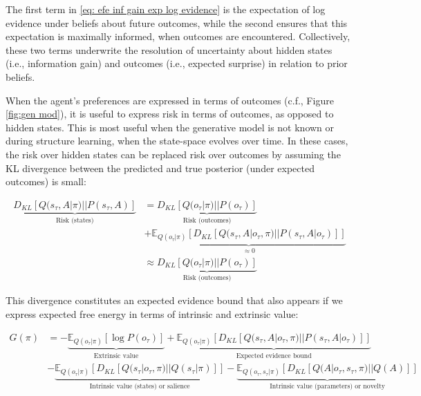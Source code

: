 \documentclass[review,12pt,authoryear]{elsarticle}
\begin{document}
The first term in \eqref{eq: efe inf gain exp log evidence} is the expectation of log evidence under beliefs about future outcomes, while the second ensures that this expectation is maximally informed, when outcomes are encountered. Collectively, these two terms underwrite the resolution of uncertainty about hidden states (i.e., information gain) and outcomes (i.e., expected surprise) in relation to prior beliefs.

When the agent's preferences are expressed in terms of outcomes (c.f., Figure \ref{fig:gen mod}), it is useful to express risk in terms of outcomes, as opposed to hidden states. This is most useful when the generative model is not known or during structure learning, when the state-space evolves over time. In these cases, the risk over hidden states can be replaced risk over outcomes by assuming the KL divergence between the predicted and true posterior (under expected outcomes) is small:

\begin{equation}
\label{eq:pref outcomes}
\begin{split}
        \underbrace{D_{KL}[Q(s_\tau, A|\pi)||P(s_\tau, A)]}_{\text{Risk (states)}} &=\underbrace{D_{KL}[Q(o_\tau|\pi)||P(o_\tau)]}_{\text{Risk (outcomes)}}\\
        &+\underbrace{\mathbb E_{Q(o_\tau |\pi)}[D_{KL}[Q(s_\tau, A|o_\tau, \pi)||P(s_\tau, A|o_\tau)]]}_{\approx 0} \\
        &\approx \underbrace{D_{KL}[Q(o_\tau|\pi)||P(o_\tau)]}_{\text{Risk (outcomes)}}
\end{split}
\end{equation}

This divergence constitutes an expected evidence bound that also appears if we express expected free energy in terms of intrinsic and extrinsic value:

\begin{equation}
\begin{split}
       G(\pi) &= -\underbrace{\mathbb E_{Q(o_\tau |\pi)}[\log P(o_\tau)]}_{\text{Extrinsic value}}+ \underbrace{\mathbb E_{Q(o_\tau|\pi)}[D_{KL}[Q(s_\tau, A|o_\tau, \pi)||P(s_\tau, A|o_\tau)]]}_{\text{Expected evidence bound}} \\
       &-\underbrace{\mathbb E_{Q(o_\tau|\pi)}[D_{KL}[Q(s_\tau|o_\tau, \pi)||Q(s_\tau |\pi)]]}_{\text{Intrinsic value (states) or salience}}
       - \underbrace{\mathbb E_{Q(o_\tau,s_\tau|\pi)}[D_{KL}[Q(A|o_\tau, s_\tau, \pi)||Q(A)]]}_{\text{Intrinsic value (parameters) or novelty}}
\end{split}
\end{equation}
\end{document}
